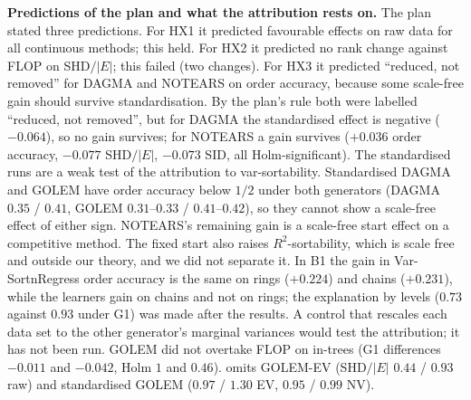 \textbf{Predictions of the plan and what the attribution rests on.} The plan
stated three predictions. For HX1 it predicted favourable effects on raw data
for all continuous methods; this held. For HX2 it predicted no rank change
against FLOP on SHD$/|E|$; this failed (two changes). For HX3 it predicted
``reduced, not removed'' for DAGMA and NOTEARS on order accuracy, because some
scale-free gain should survive standardisation. By the plan's rule both were
labelled ``reduced, not removed'', but for DAGMA the standardised effect is
negative ($-0.064$), so no gain survives; for NOTEARS a gain survives
($+0.036$ order accuracy, $-0.077$ SHD$/|E|$, $-0.073$ SID, all
Holm-significant). The standardised runs are a weak test of the attribution
to var-sortability. Standardised DAGMA and GOLEM have order accuracy below
$1/2$ under both generators (DAGMA $0.35$ / $0.41$, GOLEM $0.31$--$0.33$ /
$0.41$--$0.42$), so they cannot show a scale-free effect of either sign.
NOTEARS's remaining gain is a scale-free start effect on a competitive
method. The fixed start also raises $R^2$-sortability, which is scale free
and outside our theory, and we did not separate it. In B1 the gain in
Var-SortnRegress order accuracy is the same on rings ($+0.224$) and chains
($+0.231$), while the learners gain on chains and not on rings; the
explanation by levels ($0.73$ against $0.93$ under G1) was made after the
results. A control that rescales each data set to the other generator's
marginal variances would test the attribution; it has not been run. GOLEM
did not overtake FLOP on in-trees (G1 differences $-0.011$ and $-0.042$, Holm
$1$ and $0.46$).  omits GOLEM-EV (SHD$/|E|$ $0.44$ / $0.93$ raw)
and standardised GOLEM ($0.97$ / $1.30$ EV, $0.95$ / $0.99$ NV).

